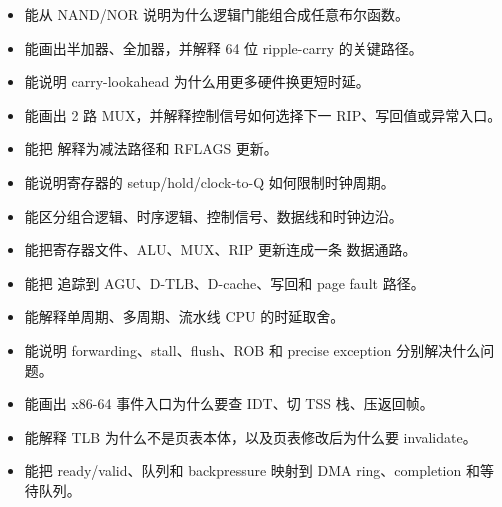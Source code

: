 \begin{rubricbox}
\begin{itemize}
\tightlist
\item 能从 NAND/NOR 说明为什么逻辑门能组合成任意布尔函数。
\item 能画出半加器、全加器，并解释 64 位 ripple-carry 的关键路径。
\item 能说明 carry-lookahead 为什么用更多硬件换更短时延。
\item 能画出 2 路 MUX，并解释控制信号如何选择下一 RIP、写回值或异常入口。
\item 能把  解释为减法路径和 RFLAGS 更新。
\item 能说明寄存器的 setup/hold/clock-to-Q 如何限制时钟周期。
\item 能区分组合逻辑、时序逻辑、控制信号、数据线和时钟边沿。
\item 能把寄存器文件、ALU、MUX、RIP 更新连成一条  数据通路。
\item 能把  追踪到 AGU、D-TLB、D-cache、写回和 page fault 路径。
\item 能解释单周期、多周期、流水线 CPU 的时延取舍。
\item 能说明 forwarding、stall、flush、ROB 和 precise exception 分别解决什么问题。
\item 能画出 x86-64 事件入口为什么要查 IDT、切 TSS 栈、压返回帧。
\item 能解释 TLB 为什么不是页表本体，以及页表修改后为什么要 invalidate。
\item 能把 ready/valid、队列和 backpressure 映射到 DMA ring、completion 和等待队列。
\end{itemize}
\end{rubricbox}
